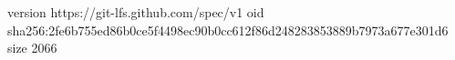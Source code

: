 version https://git-lfs.github.com/spec/v1
oid sha256:2fe6b755ed86b0ce5f4498ec90b0cc612f86d248283853889b7973a677e301d6
size 2066
